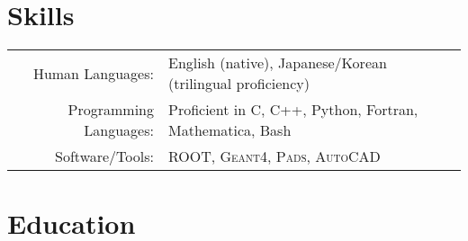 \documentclass[10pt]{article} %
\begin{document}

\section{Skills}

\noindent\begin{tabularx}{\linewidth}{@{}rl}
	Human Languages: & English (native), Japanese/Korean (trilingual proficiency)\\
	Programming Languages: & Proficient in C, C++, Python, Fortran, Mathematica, Bash\\
	Software/Tools: & \textsc{ROOT}, \textsc{Geant4}, \textsc{Pads}, \textsc{AutoCAD}
\end{tabularx}


\section{Education}
\end{document}
